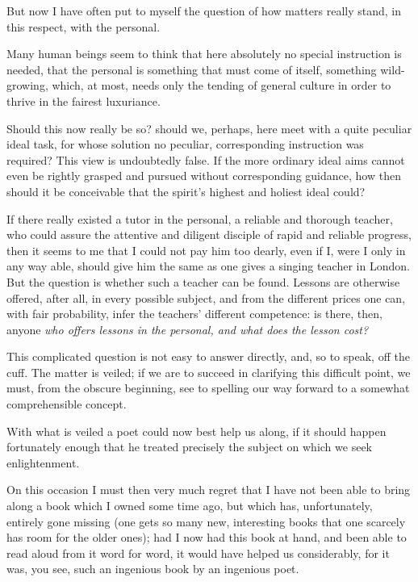 \documentclass[12pt,a4paper]{book}
\begin{document}
But now I have often put to myself the question of how matters really stand, in this respect, with the personal.

Many human beings seem to think that here absolutely no special instruction is needed, that the personal is something that must come of itself, something wild-growing, which, at most, needs only the tending of general culture in order to thrive in the fairest luxuriance.

Should this now really be so? should we, perhaps, here meet with a quite peculiar ideal task, for whose solution no peculiar, corresponding instruction was required? This view is undoubtedly false. If the more ordinary ideal aims cannot even be rightly grasped and pursued without corresponding guidance, how then should it be conceivable that the spirit's highest and holiest ideal could?

If there really existed a tutor in the personal, a reliable and thorough teacher, who could assure the attentive and diligent disciple of rapid and reliable progress, then it seems to me that I could not pay him too dearly, even if I, were I only in any way able, should give him the same as one gives a singing teacher in London.
But the question is whether such a teacher can be found. Lessons are otherwise offered, after all, in every possible subject, and from the different prices one can, with fair probability, infer the teachers' different competence: is there, then, anyone \emph{who offers lessons in the personal, and what does the lesson cost?}

This complicated question is not easy to answer directly, and, so to speak, off the cuff. The matter is veiled; if we are to succeed in clarifying this difficult point, we must, from the obscure beginning, see to spelling our way forward to a somewhat comprehensible concept.

With what is veiled a poet could now best help us along, if it should happen fortunately enough that he treated precisely the subject on which we seek enlightenment.

On this occasion I must then very much regret that I have not been able to bring along a book which I owned some time ago, but which has, unfortunately, entirely gone missing (one gets so many new, interesting books that one scarcely has room for the older ones); had I now had this book at hand, and been able to read aloud from it word for word, it would have helped us considerably, for it was, you see, such an ingenious book by an ingenious poet.
\end{document}
